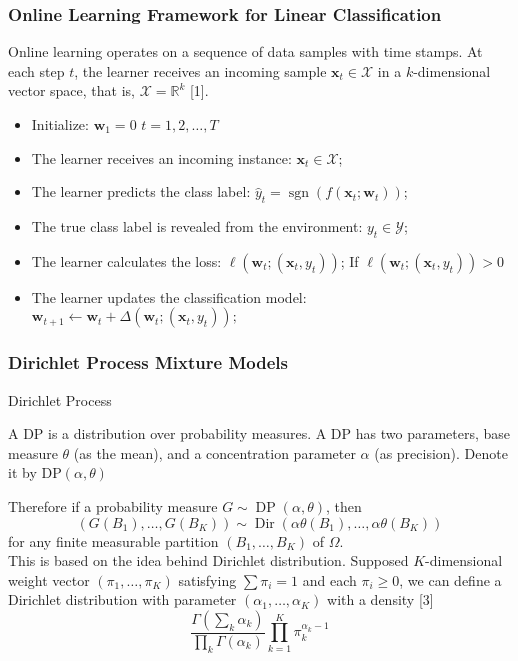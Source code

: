 \documentclass[11pt]{beamer}
\begin{document}
	\begin{frame}
		\frametitle{Online Learning Framework for Linear Classification}
Online learning operates on a sequence of data samples with time stamps. At each step $t$, the learner receives an incoming sample $\mathbf{x}_t \in \mathcal{X}$ in a $k$-dimensional vector space, that is, $\mathcal{X}=\mathbb{R}^k$ [1].
		
\begin{itemize}
	\item  Initialize: $\mathbf{w}_1=0$
	{$t=1,2, \ldots, T$}
	\item The learner receives an incoming instance: $\mathbf{x}_t \in \mathcal{X}$;
	\item The learner predicts the class label: $\hat{y}_t=\operatorname{sgn}\left(f\left(\mathbf{x}_t ; \mathbf{w}_t\right)\right)$;
	\item  The true class label is revealed from the environment: $y_t \in \mathcal{Y}$;
	\item The learner calculates the  loss: $\ell\left(\mathbf{w}_t ;\left(\mathbf{x}_t, y_t\right)\right)$;
	If {$\ell\left(\mathbf{w}_t ;\left(\mathbf{x}_t, y_t\right)\right)>0$}
	\item The learner updates the classification model:
	$\mathbf{w}_{t+1} \leftarrow \mathbf{w}_t+\Delta\left(\mathbf{w}_t ;\left(\mathbf{x}_t, y_t\right)\right) ;$ 	
\end{itemize}


	\end{frame}


	
	
	\begin{frame}
\frametitle{Dirichlet Process Mixture Models}

\begin{block}{Dirichlet Process}
	
	A DP is a distribution over probability measures.
	A DP has two parameters, base measure $\theta$ (as the mean), and a concentration parameter $\alpha$ (as precision). Denote it by $\mathrm{DP}(\alpha, \theta)$
\end{block}

Therefore if  a probability measure $G \sim \operatorname{DP}(\alpha, \theta)$, then
$$
\left(G\left(B_1\right), \ldots, G\left(B_K\right)\right) \sim \operatorname{Dir}\left(\alpha \theta\left(B_1\right), \ldots, \alpha \theta\left(B_K\right)\right)
$$
for any finite measurable partition $\left(B_1, \ldots, B_K\right)$ of $\Omega$.\\

This is based on the idea behind Dirichlet distribution. Supposed $K$-dimensional weight vector $\left(\pi_1, \ldots, \pi_K\right)$ satisfying $\sum \pi_i=1$ and each $\pi_i \geq 0$, we can define a Dirichlet distribution with parameter $\left(\alpha_1, \ldots, \alpha_K\right)$ with a density [3]
$$
\frac{\Gamma\left(\sum_k \alpha_k\right)}{\prod_k \Gamma\left(\alpha_k\right)} \prod_{k=1}^K \pi_k^{\alpha_k-1}
$$
	\end{frame}
	
\end{document}
